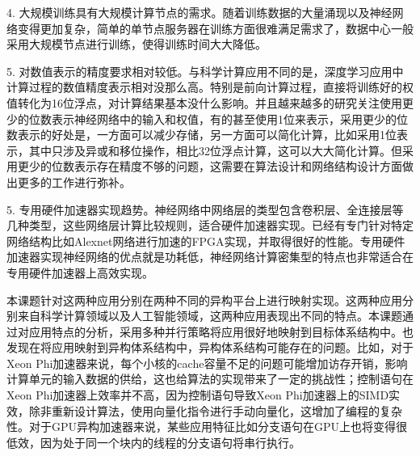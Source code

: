 \begin{compactitem}
\item[4.]大规模训练具有大规模计算节点的需求。随着训练数据的大量涌现以及神经网络变得更加复杂，简单的单节点服务器在训练方面很难满足需求了，数据中心一般采用大规模节点进行训练，使得训练时间大大降低。

\item[5.]对数值表示的精度要求相对较低。与科学计算应用不同的是，深度学习应用中计算过程的数值精度表示相对没那么高。特别是前向计算过程，直接将训练好的权值转化为16位浮点，对计算结果基本没什么影响。并且越来越多的研究关注使用更少的位数表示神经网络中的输入和权值，有的甚至使用1位来表示，采用更少的位数表示的好处是，一方面可以减少存储，另一方面可以简化计算，比如采用1位表示，其中只涉及异或和移位操作，相比32位浮点计算，这可以大大简化计算。但采用更少的位数表示存在精度不够的问题，这需要在算法设计和网络结构设计方面做出更多的工作进行弥补。

\item[5.]专用硬件加速器实现趋势。神经网络中网络层的类型包含卷积层、全连接层等几种类型，这些网络层计算比较规则，适合硬件加速器实现。已经有专门针对特定网络结构比如Alexnet网络进行加速的FPGA实现，并取得很好的性能。专用硬件加速器实现神经网络的优点就是功耗低，神经网络计算密集型的特点也非常适合在专用硬件加速器上高效实现。
\end{compactitem}

本课题针对这两种应用分别在两种不同的异构平台上进行映射实现。这两种应用分别来自科学计算领域以及人工智能领域，这两种应用表现出不同的特点。本课题通过对应用特点的分析，采用多种并行策略将应用很好地映射到目标体系结构中。也发现在将应用映射到异构体系结构中，异构体系结构可能存在的问题。比如，对于Xeon Phi加速器来说，每个小核的cache容量不足的问题可能增加访存开销，影响计算单元的输入数据的供给，这也给算法的实现带来了一定的挑战性；控制语句在Xeon Phi加速器上效率并不高，因为控制语句导致Xeon Phi加速器上的SIMD实效，除非重新设计算法，使用向量化指令进行手动向量化，这增加了编程的复杂性。对于GPU异构加速器来说，某些应用特征比如分支语句在GPU上也将变得很低效，因为处于同一个块内的线程的分支语句将串行执行。

